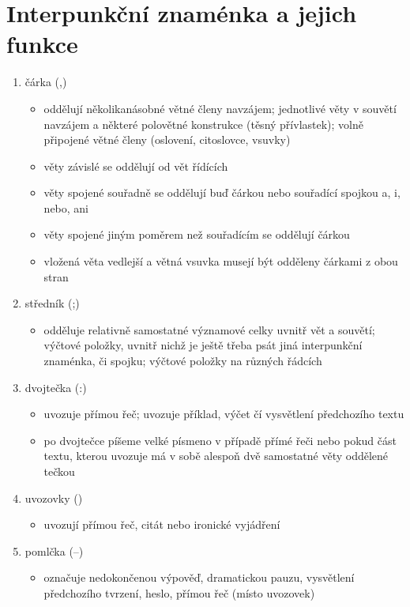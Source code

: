 \documentclass{memoir}
\begin{document}
\section*{Interpunkční znaménka a jejich funkce}
	\begin{enumerate}
		\item čárka (,)
		\begin{itemize}
			\item oddělují několikanásobné větné členy navzájem; jednotlivé věty v souvětí navzájem a některé polovětné konstrukce (těsný přívlastek); volně připojené větné členy (oslovení, citoslovce, vsuvky)
			\item věty závislé se oddělují od vět řídících
			\item věty spojené souřadně se oddělují buď čárkou nebo souřadící spojkou a, i, nebo, ani
			\item věty spojené jiným poměrem než souřadícím se oddělují čárkou
			\item vložená věta vedlejší a větná vsuvka musejí být odděleny čárkami z obou stran
		\end{itemize}
		\item středník (;)
		\begin{itemize}
			\item odděluje relativně samostatné významové celky uvnitř vět a souvětí; výčtové položky, uvnitř nichž je ještě třeba psát jiná interpunkční znaménka, či spojku; výčtové položky na různých řádcích
		\end{itemize}
		\item dvojtečka (:)
		\begin{itemize}
			\item uvozuje přímou řeč; uvozuje příklad, výčet čí vysvětlení předchozího textu
			\item po dvojtečce píšeme velké písmeno v případě přímé řeči nebo pokud část textu, kterou uvozuje má v sobě alespoň dvě samostatné věty oddělené tečkou
		\end{itemize}
		\item uvozovky (\uv{\,})
		\begin{itemize}
			\item uvozují přímou řeč, citát nebo ironické vyjádření
		\end{itemize}
		\item pomlčka (--)
		\begin{itemize}
			\item označuje nedokončenou výpověď, dramatickou pauzu, vysvětlení předchozího tvrzení, heslo, přímou řeč (místo uvozovek)

\end{itemize}
\end{enumerate}
\end{document}
